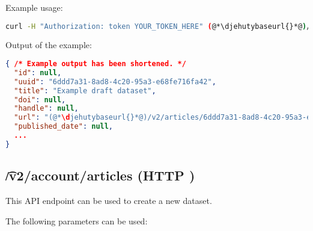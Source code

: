   Example usage:
\begin{lstlisting}[language=bash]
curl -H "Authorization: token YOUR_TOKEN_HERE" (@*\djehutybaseurl{}*@)/v2/account/articles | jq
\end{lstlisting}

  Output of the example:
\begin{lstlisting}[language=JSON]
{ /* Example output has been shortened. */
  "id": null,
  "uuid": "6ddd7a31-8ad8-4c20-95a3-e68fe716fa42",
  "title": "Example draft dataset",
  "doi": null,
  "handle": null,
  "url": "(@*\djehutybaseurl{}*@)/v2/articles/6ddd7a31-8ad8-4c20-95a3-e68fe716fa42",
  "published_date": null,
  ...
}
\end{lstlisting}

\subsection{\t{/v2/account/articles} (HTTP )}

  This API endpoint can be used to create a new dataset.

  The following parameters can be used:

